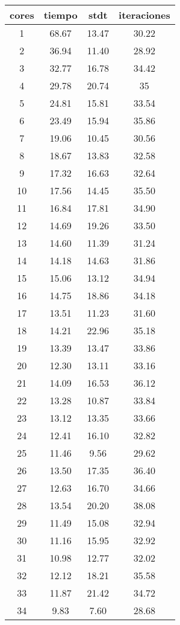 \begin{table}[h!]
\centering
\begin{tabular}{cccc}
cores & tiempo & stdt & iteraciones \\ 
\hline 
1 & 68.67 & 13.47 & 30.22 \\ 
2 & 36.94 & 11.40 & 28.92 \\ 
3 & 32.77 & 16.78 & 34.42 \\ 
4 & 29.78 & 20.74 & 35 \\ 
5 & 24.81 & 15.81 & 33.54 \\ 
6 & 23.49 & 15.94 & 35.86 \\ 
7 & 19.06 & 10.45 & 30.56 \\ 
8 & 18.67 & 13.83 & 32.58 \\ 
9 & 17.32 & 16.63 & 32.64 \\ 
10 & 17.56 & 14.45 & 35.50 \\ 
11 & 16.84 & 17.81 & 34.90 \\ 
12 & 14.69 & 19.26 & 33.50 \\ 
13 & 14.60 & 11.39 & 31.24 \\ 
14 & 14.18 & 14.63 & 31.86 \\ 
15 & 15.06 & 13.12 & 34.94 \\ 
16 & 14.75 & 18.86 & 34.18 \\ 
17 & 13.51 & 11.23 & 31.60 \\ 
18 & 14.21 & 22.96 & 35.18 \\ 
19 & 13.39 & 13.47 & 33.86 \\ 
20 & 12.30 & 13.11 & 33.16 \\ 
21 & 14.09 & 16.53 & 36.12 \\ 
22 & 13.28 & 10.87 & 33.84 \\ 
23 & 13.12 & 13.35 & 33.66 \\ 
24 & 12.41 & 16.10 & 32.82 \\ 
25 & 11.46 & 9.56 & 29.62 \\ 
26 & 13.50 & 17.35 & 36.40 \\ 
27 & 12.63 & 16.70 & 34.66 \\ 
28 & 13.54 & 20.20 & 38.08 \\ 
29 & 11.49 & 15.08 & 32.94 \\ 
30 & 11.16 & 15.95 & 32.92 \\ 
31 & 10.98 & 12.77 & 32.02 \\ 
32 & 12.12 & 18.21 & 35.58 \\ 
33 & 11.87 & 21.42 & 34.72 \\ 
34 & 9.83 & 7.60 & 28.68 \\ 

\end{tabular}
\end{table}
